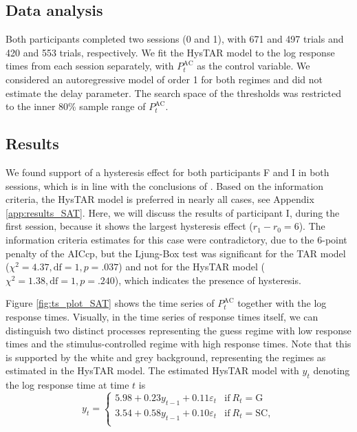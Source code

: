\documentclass{article}
\begin{document}
\subsection{Data analysis}
Both participants completed two sessions (0 and 1), with 671 and 497 trials and 420 and 553 trials, respectively.
We fit the HysTAR model to the log response times from each session separately, with $P^{\mathrm{AC}}_t$ as the control variable. 
We considered an autoregressive model of order 1 for both regimes and did not estimate the delay parameter.
The search space of the thresholds was restricted to the inner 80\% sample range of $P^{\mathrm{AC}}_t$.

\subsection{Results}
We found support of a hysteresis effect for both participants F and I in both sessions, which is in line with the conclusions of \citet{speedaccuracy}.
Based on the information criteria, the HysTAR model is preferred in nearly all cases, see Appendix \ref{app:results_SAT}.
Here, we will discuss the results of participant I, during the first session, because it shows the largest hysteresis effect ($r_1 - r_0 = 6$). 
The information criteria estimates for this case were contradictory, due to the 6-point penalty of the AICcp, 
but the Ljung-Box test was significant for the TAR model ($\chi^2 = 4.37, \text{df} = 1, p = .037$) and not for the HysTAR model ($\chi^2 = 1.38, \text{df} = 1, p = .240$), which indicates the presence of hysteresis.

Figure \ref{fig:ts_plot_SAT} shows the time series of $P^{\mathrm{AC}}_t$ together with the log response times.
Visually, in the time series of response times itself, we can distinguish two distinct processes representing the guess regime with low response times and the stimulus-controlled regime with high response times.
Note that this is supported by the white and grey background, representing the regimes as estimated in the HysTAR model.
The estimated HysTAR model with $y_t$ denoting the log response time at time $t$ is
\begin{equation}
y_t = 
\begin{cases}
5.98 + 0.23 y_{t-1} + 0.11 \varepsilon_t & \text{if}~R_{t} = \mathrm{G}\\
3.54 + 0.58 y_{t-1} + 0.10 \varepsilon_t & \text{if}~R_{t} = \mathrm{SC}, \\
\end{cases}
\end{equation}
\end{document}
